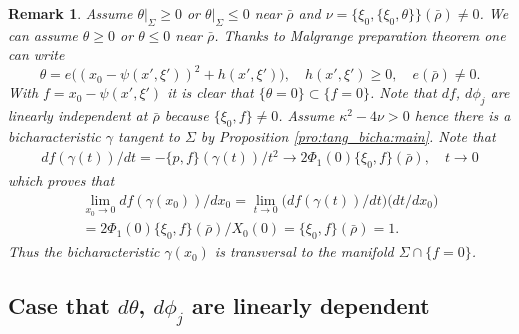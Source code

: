 \documentclass[12pt,leqno]{article} %
\def\ga{\gamma}
\def\bro{\bar\rho}
\def\bro{\bar\rho}
\numberwithin{equation}{section}
\newtheorem{remark}{Remark}[section]
\begin{document}
%
%
%
\begin{remark}
\label{rem:b}\rm Assume $\theta|_{\Sigma}\geq 0$ or $\theta|_{\Sigma}\leq 0$ near $\bro$ and $\nu=\{\xi_0,\{\xi_0,\theta\}\}(\bro)\neq 0$. We can assume $\theta\geq 0$ or $\theta\leq 0$ near $\bro$. Thanks to  Malgrange preparation theorem one can write
%
\[
\theta=e\big((x_0-\psi(x',\xi'))^2+h(x',\xi')\big),\quad h(x',\xi')\geq 0,\quad e(\bro)\neq 0.
\]
%
With $f=x_0-\psi(x',\xi')$ it is clear that $\{\theta=0\}\subset\{f=0\}$. Note that $df$, $d\phi_j$ are linearly independent at $\bro$ because $\{\xi_0,f\}\neq 0$. Assume  $\kappa^2-4\nu>0$ hence there is a bicharacteristic $\ga$ tangent to $\Sigma$ by Proposition \ref{pro:tang_bicha:main}. Note that
%
\begin{gather*}
df(\ga(t))/dt=-\{p,f\}(\ga(t))/t^2\to 2\Phi_1(0)\{\xi_0, 
f\}(\bro),\quad t\to 0
\end{gather*}
%
which proves that 
%
\begin{gather*}
\lim_{x_0\to 0}df(\ga(x_0))/dx_0=\lim_{t\to 0}\big(df(\ga(t))/dt\big)\big(dt/dx_0\big)\\
=2\Phi_1(0)\{\xi_0, 
f\}(\bro)/X_0(0)=\{\xi_0, 
f\}(\bro)=1.
\end{gather*}
%
Thus the bicharacteristic $\ga(x_0)$ is transversal to the manifold $\Sigma\cap \{f=0\}$.
\end{remark}
%



\subsection{Case that $d\theta$, $d\phi_j$ are linearly dependent}

\end{document}
